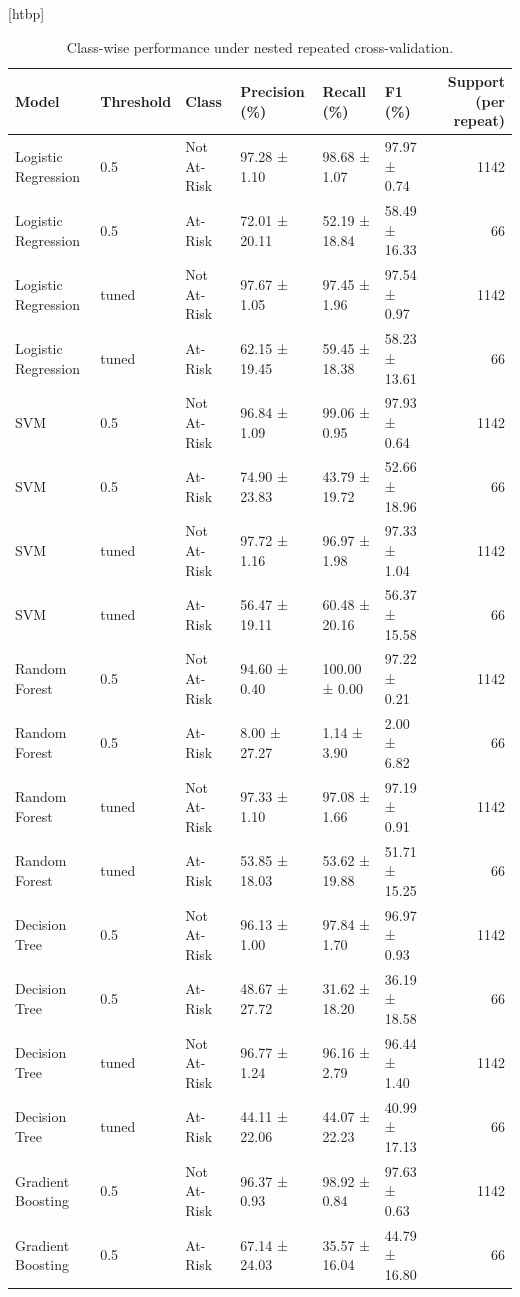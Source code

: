\begin{table}
\small[htbp]
\caption{Class-wise performance under nested repeated cross-validation.}
\label{tab:P02_nested_cv_classwise}
\begin{tabular}{llllllr}
\toprule
Model & Threshold & Class & Precision (\%) & Recall (\%) & F1 (\%) & Support (per repeat) \\
\midrule
Logistic Regression & 0.5 & Not At-Risk & 97.28 ± 1.10 & 98.68 ± 1.07 & 97.97 ± 0.74 & 1142 \\
Logistic Regression & 0.5 & At-Risk & 72.01 ± 20.11 & 52.19 ± 18.84 & 58.49 ± 16.33 & 66 \\
Logistic Regression & tuned & Not At-Risk & 97.67 ± 1.05 & 97.45 ± 1.96 & 97.54 ± 0.97 & 1142 \\
Logistic Regression & tuned & At-Risk & 62.15 ± 19.45 & 59.45 ± 18.38 & 58.23 ± 13.61 & 66 \\
SVM & 0.5 & Not At-Risk & 96.84 ± 1.09 & 99.06 ± 0.95 & 97.93 ± 0.64 & 1142 \\
SVM & 0.5 & At-Risk & 74.90 ± 23.83 & 43.79 ± 19.72 & 52.66 ± 18.96 & 66 \\
SVM & tuned & Not At-Risk & 97.72 ± 1.16 & 96.97 ± 1.98 & 97.33 ± 1.04 & 1142 \\
SVM & tuned & At-Risk & 56.47 ± 19.11 & 60.48 ± 20.16 & 56.37 ± 15.58 & 66 \\
Random Forest & 0.5 & Not At-Risk & 94.60 ± 0.40 & 100.00 ± 0.00 & 97.22 ± 0.21 & 1142 \\
Random Forest & 0.5 & At-Risk & 8.00 ± 27.27 & 1.14 ± 3.90 & 2.00 ± 6.82 & 66 \\
Random Forest & tuned & Not At-Risk & 97.33 ± 1.10 & 97.08 ± 1.66 & 97.19 ± 0.91 & 1142 \\
Random Forest & tuned & At-Risk & 53.85 ± 18.03 & 53.62 ± 19.88 & 51.71 ± 15.25 & 66 \\
Decision Tree & 0.5 & Not At-Risk & 96.13 ± 1.00 & 97.84 ± 1.70 & 96.97 ± 0.93 & 1142 \\
Decision Tree & 0.5 & At-Risk & 48.67 ± 27.72 & 31.62 ± 18.20 & 36.19 ± 18.58 & 66 \\
Decision Tree & tuned & Not At-Risk & 96.77 ± 1.24 & 96.16 ± 2.79 & 96.44 ± 1.40 & 1142 \\
Decision Tree & tuned & At-Risk & 44.11 ± 22.06 & 44.07 ± 22.23 & 40.99 ± 17.13 & 66 \\
Gradient Boosting & 0.5 & Not At-Risk & 96.37 ± 0.93 & 98.92 ± 0.84 & 97.63 ± 0.63 & 1142 \\
Gradient Boosting & 0.5 & At-Risk & 67.14 ± 24.03 & 35.57 ± 16.04 & 44.79 ± 16.80 & 66 \\

\end{tabular}
\end{table}
